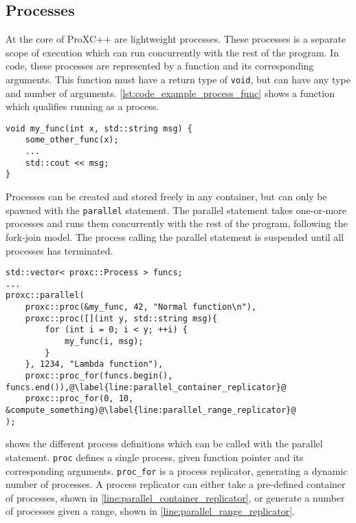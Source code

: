\subsection{Processes}

At the core of ProXC++ are lightweight processes. These processes is a separate scope of execution which can run concurrently with the rest of the program. In code, these processes are represented by a function and its corresponding arguments. This function must have a return type of \lstinline[style={CustomC++}]|void|, but can have any type and number of arguments. \cref{lst:code_example_process_func} shows a function which qualifies running as a process.

\begin{lstfloat}
\begin{lstlisting}[caption={Example of process function.}, label={lst:code_example_process_func}, style={CustomC++}]
void my_func(int x, std::string msg) {
    some_other_func(x);
    ... 
    std::cout << msg;
}
\end{lstlisting}
\end{lstfloat}

Processes can be created and stored freely in any container, but can only be spawned with the \texttt{parallel} statement. The parallel statement takes one\hyp{}or\hyp{}more processes and runs them concurrently with the rest of the program, following the fork\hyp{}join model. The process calling the parallel statement is suspended until all processes has terminated.

\begin{lstfloat}
\begin{lstlisting}[caption={The parallel statement.}, label={lst:parallel_statement}, style={CustomC++}]
std::vector< proxc::Process > funcs;
...
proxc::parallel(
    proxc::proc(&my_func, 42, "Normal function\n"),
    proxc::proc([](int y, std::string msg){
        for (int i = 0; i < y; ++i) {
            my_func(i, msg);
        }
    }, 1234, "Lambda function"),
    proxc::proc_for(funcs.begin(), funcs.end()),@\label{line:parallel_container_replicator}@
    proxc::proc_for(0, 10, &compute_something)@\label{line:parallel_range_replicator}@
);
\end{lstlisting}
\end{lstfloat}

 shows the different process definitions which can be called with the parallel statement. \texttt{proc} defines a single process, given function pointer and its corresponding arguments. \texttt{proc\_for} is a process replicator, generating a dynamic number of processes. A process replicator can either take a pre\hyp{}defined container of processes, shown in \cref{line:parallel_container_replicator}, or generate a number of processes given a range, shown in \cref{line:parallel_range_replicator}.

